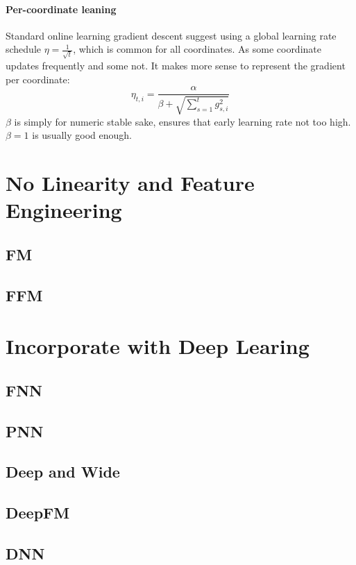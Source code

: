 \documentclass{article}
\begin{document}
\paragraph{Per-coordinate leaning} Standard online learning gradient descent suggest using a global learning rate schedule $\eta=\frac{1}{\sqrt{t}}$, which is common for all coordinates. As some coordinate updates frequently and some not. It makes more sense to represent the gradient per coordinate:
$$\eta_{t,i}=\frac{\alpha}{\beta+\sqrt{\sum_{s=1}^{t}g^{2}_{s,i}}}$$
$\beta$ is simply for numeric stable sake, ensures that early learning rate not too high. $\beta=1$ is usually good enough. 
\section{No Linearity and Feature Engineering}
\subsection{FM}
\subsection{FFM}
\section{Incorporate with Deep Learing}
\subsection{FNN}
\subsection{PNN}
\subsection{Deep and Wide}
\subsection{DeepFM}
\subsection{DNN}



\end{document}
